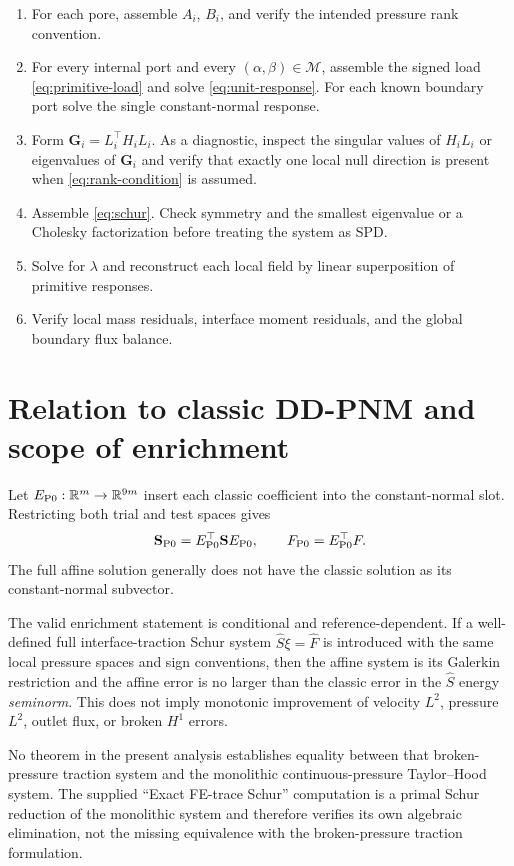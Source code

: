 \documentclass[11pt,a4paper]{article}
\newcommand{\R}{\mathbb{R}}
\newcommand{\DtN}{\mathbf{G}}
\newcommand{\Schur}{\mathbf{S}}
\newcommand{\modeset}{\mathcal{M}}
\begin{document}
\begin{enumerate}[leftmargin=*,itemsep=2pt]
 \item For each pore, assemble $A_i$, $B_i$, and verify the intended pressure
 rank convention.
 \item For every internal port and every $(\alpha,\beta)\in\modeset$, assemble
 the signed load \eqref{eq:primitive-load} and solve
 \eqref{eq:unit-response}.  For each known boundary port solve the single
 constant-normal response.
 \item Form $\DtN_i=L_i^\top H_iL_i$.  As a diagnostic, inspect the singular
 values of $H_iL_i$ or eigenvalues of $\DtN_i$ and verify that exactly one
 local null direction is present when \eqref{eq:rank-condition} is assumed.
 \item Assemble \eqref{eq:schur}.  Check symmetry and the smallest eigenvalue
 or a Cholesky factorization before treating the system as SPD.
 \item Solve for $\lambda$ and reconstruct each local field by linear
 superposition of primitive responses.
 \item Verify local mass residuals, interface moment residuals, and the global
 boundary flux balance.
\end{enumerate}

\section{Relation to classic DD-PNM and scope of enrichment}

Let $E_{\rm P0}:\R^m\to\R^{9m}$ insert each classic coefficient into the
constant-normal slot.  Restricting both trial and test spaces gives
\[
 \Schur_{\rm P0}=E_{\rm P0}^\top\Schur E_{\rm P0},\qquad
 F_{\rm P0}=E_{\rm P0}^\top F.
\]
The full affine solution generally does not have the classic solution as its
constant-normal subvector.

The valid enrichment statement is conditional and reference-dependent.  If a
well-defined full interface-traction Schur system $\widehat S\xi=\widehat F$
is introduced with the same local pressure spaces and sign conventions, then
the affine system is its Galerkin restriction and the affine error is no larger
than the classic error in the $\widehat S$ energy \emph{seminorm}.  This does
not imply monotonic improvement of velocity $L^2$, pressure $L^2$, outlet
flux, or broken $H^1$ errors.

No theorem in the present analysis establishes equality between that
broken-pressure traction system and the monolithic continuous-pressure
Taylor--Hood system.  The supplied ``Exact FE-trace Schur'' computation is a
primal Schur reduction of the monolithic system and therefore verifies its own
algebraic elimination, not the missing equivalence with the broken-pressure
traction formulation.
\end{document}
